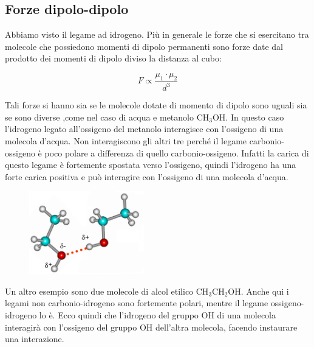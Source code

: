 \subsection{Forze dipolo-dipolo}
Abbiamo visto il legame ad idrogeno. Più in generale le forze che si esercitano tra molecole che possiedono momenti di dipolo permanenti sono forze date dal prodotto dei momenti di dipolo diviso la distanza al cubo:

$$F \propto \frac{\mu_1 \cdot \mu_2}{d^3}$$

Tali forze si hanno sia se le molecole dotate di momento di dipolo sono uguali sia se sono diverse ,come nel caso di acqua e metanolo CH$_3$OH. In questo caso l'idrogeno legato all'ossigeno del metanolo interagisce con l'ossigeno di una molecola d'acqua. Non interagiscono gli altri tre perché il legame carbonio-ossigeno è poco polare a differenza di quello carbonio-ossigeno. Infatti la carica di questo legame è fortemente spostata verso l'ossigeno, quindi l'idrogeno ha una forte carica positiva e può interagire con l'ossigeno di una molecola d'acqua.

\hspace{0.5cm}\begin{minipage}{0.35 \textwidth}
    \begin{figure}[H]
        \includegraphics[width=5cm]{immagini/alcol_etilico.png}
    \end{figure}
\end{minipage}
\begin{minipage}{0.6 \textwidth}
    \vspace{0.6cm}Un altro esempio sono due molecole di alcol etilico CH$_3$CH$_2$OH. Anche qui i legami non carbonio-idrogeno sono fortemente polari, mentre il legame ossigeno-idrogeno lo è. Ecco quindi che l'idrogeno del gruppo OH di una molecola interagirà con l'ossigeno del gruppo OH dell'altra molecola, facendo instaurare una interazione.
\end{minipage}

